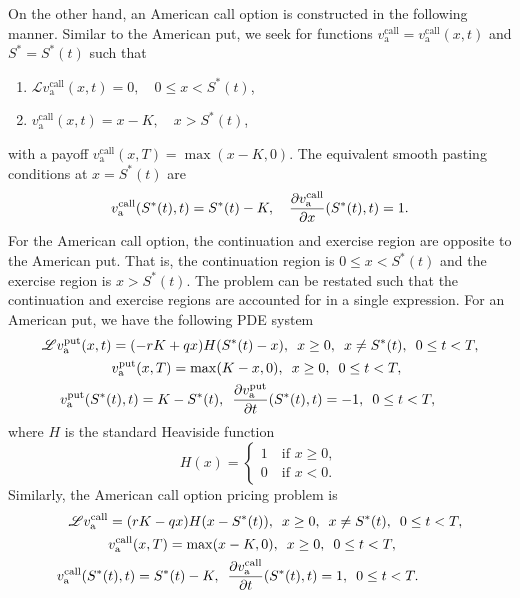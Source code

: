 	On the other hand, an American call option is constructed in the following manner. Similar to the American put, we seek for functions $v_\text{a}^{\text{call}} = v_\text{a}^{\text{call}}(x,t)$ and $S^* = S^*(t)$ such that
	\begin{enumerate}
			\item $\mathscr{L}v_\text{a}^{\text{call}}(x,t) = 0, \quad 0 \leq x < S^*(t)$,
			\item $v_\text{a}^{\text{call}}(x,t) = x - K, \quad x > S^*(t)$,
	\end{enumerate}
	with a payoff $v_\text{a}^{\text{call}}(x,T) = \max(x-K,0)$. The equivalent smooth pasting conditions at $x = S^*(t)$ are
		\begin{equation*}
			v_\text{a}^{\text{call}}(S^*(t),t) = S^*(t) - K, \quad \frac{\partial v_\text{a}^{\text{call}}}{\partial x}(S^*(t),t) = 1.
		\end{equation*}
	For the American call option, the continuation and exercise region are opposite to the American put. That is, the continuation region is $0 \leq x < S^*(t)$ and the exercise region is $x > S^*(t)$. The problem can be restated such that the continuation and exercise regions are accounted for in a single expression. For an American put, we have the following PDE system
    \begin{align}
            \label{eqn:amerput}
            \mathscr{L}v_\text{a}^{\text{put}}(x,t) &= (-rK + qx)H(S^*(t)-x), \enskip x \geq 0, \enskip x \neq S^*(t), \enskip 0 \leq t < T,\\
            \label{eqn:amerputTerminal}
            &v_\text{a}^{\text{put}}(x,T) = \max(K-x,0), \enskip x \geq 0, \enskip 0 \leq t < T,\\
            \label{eqn:amerputpasting}
           v_\text{a}^{\text{put}}(S^*( & t),t) = K - S^*(t), \enskip \frac{\partial v_\text{a}^{\text{put}}}{\partial t}(S^*(t),t) = -1, \enskip 0 \leq t < T,
    \end{align}
    where $H$ is the standard Heaviside function
      \begin{equation}
      		\label{eqn:heaviside}
          H(x) =
          \begin{cases}
            1 \quad \text{if } x \geq 0, \\
            0 \quad \text{if } x < 0.
        \end{cases}
      \end{equation}
Similarly, the American call option pricing problem is
	 \begin{align}
            \label{eqn:amercall}
            \mathscr{L}v_\text{a}^{\text{call}}&= (rK - qx)H(x-S^*(t)), \enskip x \geq 0, \enskip x \neq S^*(t), \enskip 0 \leq t < T,\\
            \label{eqn:amercallTerminal}
            &v_\text{a}^{\text{call}}(x,T) = \max(x-K,0), \enskip x \geq 0, \enskip 0 \leq t < T,\\
            \label{eqn:amercallpasting}
           v_\text{a}^{\text{call}}(S^*( & t),t) = S^*(t) - K, \enskip \frac{\partial v_\text{a}^{\text{call}}}{\partial t}(S^*(t),t) = 1, \enskip 0 \leq t < T.
    \end{align}
